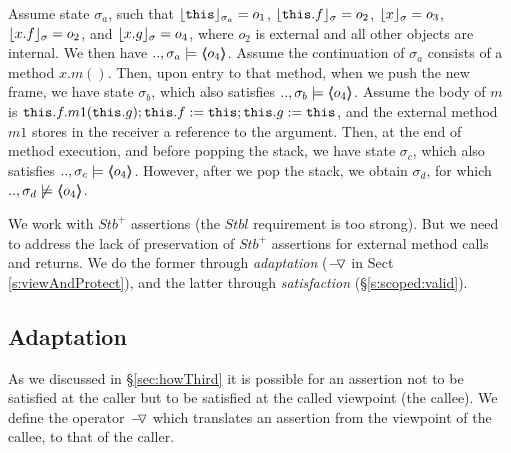 \begin{example}
\label{ex:motivate:scoped}
Assume state $\sigma_a$, such that $\interpret {\sigma_a} {\prg{this}}=o_1$, $\interpret {\sigma} {\prg{this}.f}=o_2$, $\interpret {\sigma} {x}=o_3$, $\interpret {\sigma} {x.f}=o_2$,  
and $\interpret {\sigma} {x.g}=o_4$, where $o_2$ is external and all other objects are internal. 
We then have $..,\sigma_a \models  \inside {o_4}$.
Assume %
 the continuation of $\sigma_a$   consists of a method $x.m()$. Then,
upon entry to that method, when we push the new frame, we have  state $\sigma_b$, which also satisfies $..,\sigma_b \models  \inside {o_4}$.
Assume %
 the   body of $m$ is $\prg{this}.f.m1(\prg{this}.g); \prg{this}.f := \prg{this};  \prg{this}.g := \prg{this}$, and %
 the external method $m1$ stores in the 
receiver a reference to the argument.
Then, at the end of method execution, and before popping the stack, we have   state $\sigma_c$, which also satisfies $..,\sigma_c \models  \inside {o_4}$.
However, after we pop the stack, we obtain $\sigma_d$, for which $..,\sigma_d \not\models  \inside {o_4}$.
\end{example}


{We work with  $Stb^+$  assertions   (the  $Stbl$ requirement is too strong). 
But  we need to address the lack of preservation of $Stb^+$ assertions  {for external method calls and returns}.
We do the former   through    \emph{adaptation}   ($\FIXSymbolA$ in Sect \ref{s:viewAndProtect}), and the latter through  
\emph{\scoped satisfaction} (\S \ref{s:scoped:valid}).
  }
   
 \subsection{Adaptation } %
 \label{s:preserve:encaps}
 \label{s:viewAndProtect}
 
 As we discussed in \S  \ref{sec:howThird} it is possible for an assertion  not to be satisfied at the caller
but to be  satisfied at the called viewpoint {(the callee)}. %
We define the operator $\FIXSymbolA$ which  translates an assertion from the viewpoint of the callee, to that of the caller.

